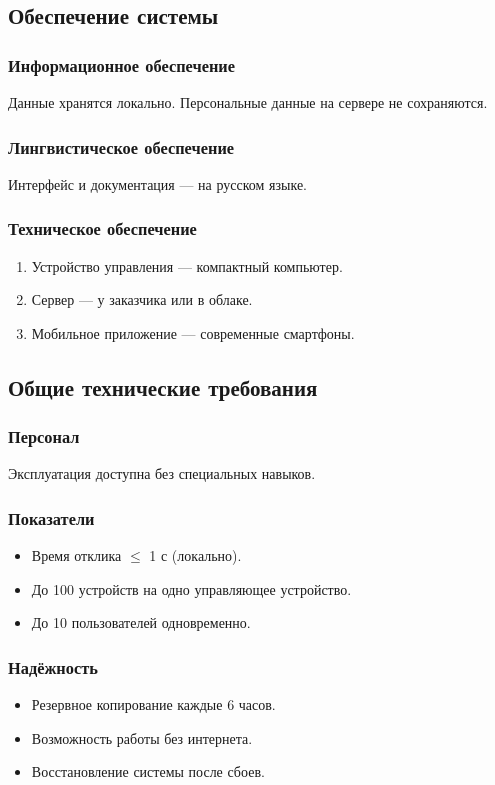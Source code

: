\documentclass[oneside,a4paper,14pt]{extarticle}
\begin{document}
\subsection{Обеспечение системы}
\subsubsection{Информационное обеспечение}
Данные хранятся локально. Персональные данные на сервере не сохраняются.

\subsubsection{Лингвистическое обеспечение}
Интерфейс и документация — на русском языке.

\subsubsection{Техническое обеспечение}
\begin{enumerate}
    \item Устройство управления — компактный компьютер.
    \item Сервер — у заказчика или в облаке.
    \item Мобильное приложение — современные смартфоны.
\end{enumerate}

\subsection{Общие технические требования}
\subsubsection{Персонал}
Эксплуатация доступна без специальных навыков.

\subsubsection{Показатели}
\begin{itemize}
    \item Время отклика $\leq$ 1 с (локально).
    \item До 100 устройств на одно управляющее устройство.
    \item До 10 пользователей одновременно.
\end{itemize}

\subsubsection{Надёжность}
\begin{itemize}
    \item Резервное копирование каждые 6 часов.
    \item Возможность работы без интернета.
    \item Восстановление системы после сбоев.
\end{itemize}
\end{document}
